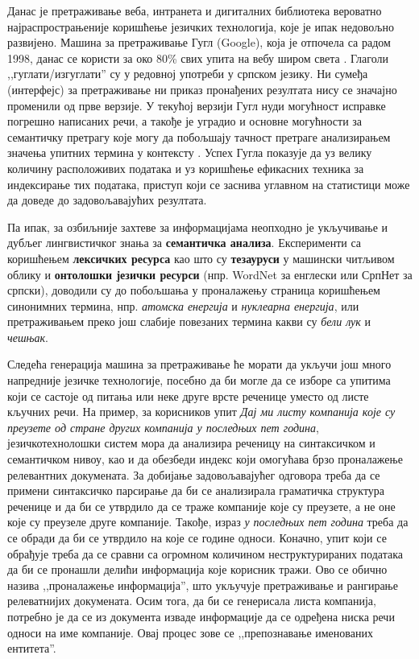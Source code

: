 \begin{multicols}{2}
Данас је претраживање веба, интранета и дигиталних библиотека вероватно најраспрострањеније коришћење језичких технологија, које је ипак недовољно развијено. Машина за претраживање Гугл (Google), која је отпочела са радом 1998, данас се користи за око 80\% свих упита на вебу широм света \cite{SPIEGEL}. Глаголи ,,гуглати/изгуглати'' су у редовној употреби у српском језику. Ни сумеђа (интерфејс) за претраживање ни приказ пронађених резултата нису се значајно променили од прве верзије. У текућој верзији Гугл нуди могућност исправке погрешно написаних речи, а такође је уградио и основне могућности за семантичку претрагу које могу да побољшају тачност претраге анализирањем значења упитних термина у контексту \cite{PCWORLD}.  Успех Гугла показује да уз велику количину расположивих података и уз коришћење ефикасних техника за индексирање тих података, приступ који се заснива углавном на статистици може да доведе до задовољавајућих резултата.  

Па ипак, за озбиљније захтеве за информацијама неопходно је укључивање и дубљег лингвистичког знања за \textbf{семантичка анализа}. Експерименти са коришћењем \textbf{лексичких ресурса} као што су \textbf{тезауруси} у машински читљивом облику и \textbf{онтолошки језички ресурси} (нпр. WordNet за енглески или СрпНет за српски), доводили су до побољшања у проналажењу страница коришћењем синонимних термина, нпр. \textit{атомска енергија} и \textit{нуклеарна енергија}, или претраживањем преко још слабије повезаних термина какви су \textit{бели лук} и \textit{чешњак}. 

Следећа генерација машина за претраживање ће морати да укључи још много напредније језичке технологије, посебно да би могле да се изборе са упитима који се састоје од питања или неке друге врсте реченице уместо од листе кључних речи. На пример, за корисников упит \textit{Дај ми листу компанија које су преузете од стране других компанија у последњих пет година}, језичкотехнолошки систем мора да анализира реченицу на синтаксичком и семантичком нивоу, као и да обезбеди индекс који омогућава брзо проналажење релевантних докумената. За добијање задовољавајућег одговора треба да се примени синтаксичко парсирање да би се анализирала граматичка структура реченице и да би се утврдило да се траже компаније које су преузете, а не оне које су преузеле друге компаније. Такође, израз \textit{у последњих пет година} треба да се обради да би се утврдило на које се године односи. Коначно, упит који се обрађује треба да се сравни са огромном количином неструктурираних података да би се пронашли делићи информација које корисник тражи. Ово се обично назива ,,проналажење информација'', што укључује претраживање и рангирање релеватнијих докумената. Осим тога, да би се генерисала листа компанија, потребно је да се из документа  изваде информације да се одређена ниска речи односи на име компаније. Овај процес зове се ,,препознавање именованих ентитета''. 


\end{multicols}
